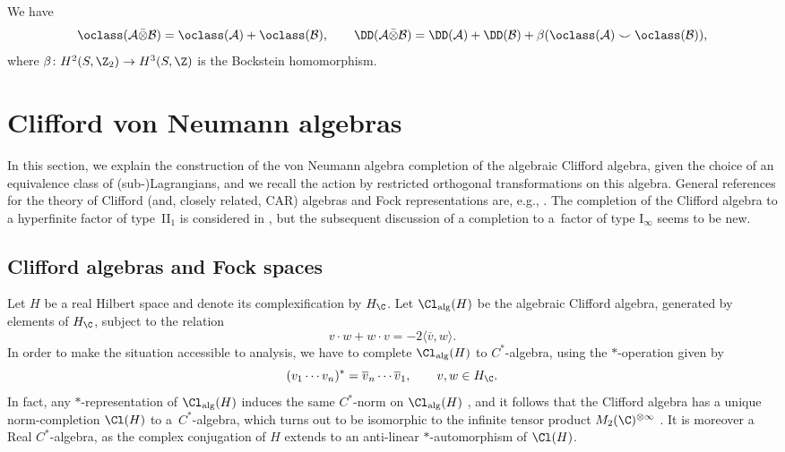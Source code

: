 \begin{Proposition} \label{PropTensorProductDD}
We have
\begin{equation*}
\oclass(\mathcal{A} \bar{\otimes}\mathcal{B}) = \oclass(\mathcal{A}) + \oclass(\mathcal{B}), \qquad \DD(\mathcal{A} \bar{\otimes}  \mathcal{B}) = \DD(\mathcal{A}) + \DD(\mathcal{B}) + \beta(\oclass(\mathcal{A}) \smile \oclass(\mathcal{B})),
\end{equation*}
where $\beta\colon H^2(S, \Z_2) \to H^3(S, \Z)$ is the Bockstein homomorphism.
\end{Proposition}

\section{Clifford von Neumann algebras}

In this section, we explain the construction of the von Neumann algebra completion of the algebraic Clifford algebra, given the choice of an equivalence class of (sub-)Lagrangians, and we recall the action by restricted orthogonal transformations on this algebra.
General references for the theory of Clifford (and, closely related, CAR) algebras and Fock representations are, e.g., \cite{Araki1,PlymenRobinson,PressleySegal,PreviatoSpera,ShaleStinespring,SperaWurzbacherSpinors,WurzbacherFermionicSecondQuantization}.
The completion of the Clifford algebra to a hyperfinite factor of type~II$_1$ is considered in \cite[Section~1.3]{PlymenRobinson}, but the subsequent discussion of a completion to a~factor of type I$_\infty$ seems to be new.

\subsection{Clifford algebras and Fock spaces} \label{SectionCliffordAlgebras}

Let $H$ be a real Hilbert space and denote its complexification by $H_\C$.
Let $\Cl_{\mathrm{alg}}(H)$ be the algebraic Clifford algebra, generated by elements of $H_\C$, subject to the relation
\begin{equation*}
 v \cdot w + w \cdot v = - 2 \langle \overline{v}, w\rangle.
\end{equation*}
In order to make the situation accessible to analysis, we have to complete $\Cl_{\mathrm{alg}}(H)$ to $C^*$-algebra, using the $*$-operation given by
\begin{equation*}
 (v_1\cdots v_n)^* = \overline{v}_n \cdots \overline{v}_1, \qquad v, w \in H_\C.
\end{equation*}
In fact, any $*$-representation of $\Cl_{\mathrm{alg}}(H)$ induces the same $C^*$-norm on $\Cl_{\mathrm{alg}}(H)$ \cite[Proposition~1]{ShaleStinespring}, and it follows that the Clifford algebra has a unique norm-completion $\Cl(H)$ to a~$C^*$-algebra, which turns out to be isomorphic to the infinite tensor product $M_2(\C)^{\otimes \infty}$ \cite{Araki1}.
It is moreover a Real $C^*$-algebra, as the complex conjugation of $H$ extends to an anti-linear $*$-automorphism of $\Cl(H)$.

